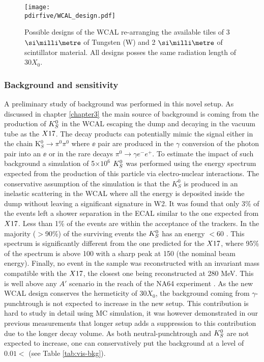 \begin{figure}[tbh!]
  \centering
  \texttt{[image: \\pdirfive/WCAL\_design.pdf]}
  \caption[New WCAL design for 2021]{Possible designs of the WCAL re-arranging the available tiles of 3 $\mmi$ of Tungsten (W) and 2 $\mmi$ of scintillator material. All designs posses the same radiation length of 30$X_0$.}
  \label{fig:wcal-design}
\end{figure}


\subsubsection{Background and sensitivity}
\label{ch5:sec:background-sensitivity}

A preliminary study of background was performed in this novel setup. As discussed in chapter \ref{chapter3} the main source of background is coming from the production of $K^0_S$ in the WCAL escaping the dump and decaying in the vacuum tube as the $X17$. The decay products can potentially mimic the signal either in the chain K$^0_S \rightarrow \pi^0 \pi^0$ where $\ee$ pair are produced in the $\gamma$ conversion of the photon pair into an $\ee$ or in the rare decays $\pi^0 \rightarrow \gamma e^- e^+$. To estimate the impact of such background a simulation of 5$\times 10^6$ $K^0_S$ was performed using the energy spectrum expected from the production of this particle via electro-nuclear interactions.
The conservative assumption of the simulation is that the $K^0_S$ is produced in an inelastic scattering in the WCAL where all the energy is deposited inside the dump without leaving a significant signature in W2. It was found that only 3\% of the events left a shower separation in the ECAL similar to the one expected from $X17$. Less than 1\% of the events are within the acceptance of the trackers. In the majority ($>$90\%) of the surviving events the $K^0_S$ has an energy $<$60 \gev. This spectrum is significantly different from the one predicted for the $X17$, where 95\% of the spectrum is above 100 \gev with a sharp peak at 150 \gev (the nominal beam energy). Finally, no event in the sample was reconstructed with an invariant mass compatible with the $X17$, the closest one being reconstructed at 280 MeV. This is well above any $A'$ scenario in the reach of the NA64 experiment \cite{Banerjee:2019hmi}. As the new WCAL design conserves the hermeticity of 30$X_0$, the background coming from $\gamma$-punchtrough is not expected to increase in the new setup. This contribution is hard to study in detail using MC simulation, it was however demonstrated in our previous measurements \cite{Banerjee:2019hmi} that longer setup adds a suppression to this contribution due to the longer decay volume. As both neutral-punchtrough and $K^0_S$ are not expected to increase, one can conservatively put the background at a level of $0.01<$ (see Table \ref{tab:vis-bkg}).


